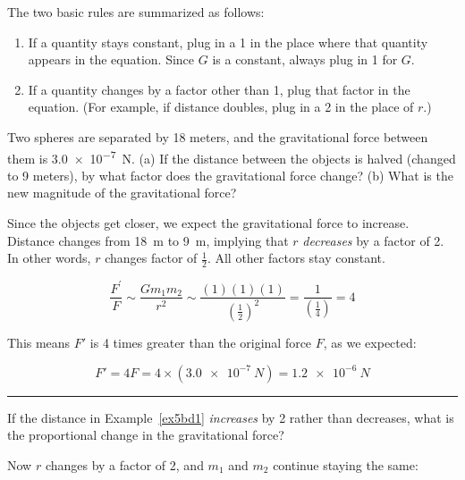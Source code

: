\documentclass{article}
\begin{document}
The two basic rules are summarized as follows:

\begin{enumerate}
\setlength\itemsep{0ex}
    \item If a quantity stays constant, plug in a 1 in the place where that quantity appears in the equation. Since $G$ is a constant, always plug in 1 for $G$.
    \item If a quantity changes by a factor other than 1, plug that factor in the equation. (For example, if distance doubles, plug in a 2 in the place of $r$.)
\end{enumerate}



\begin{example} \label{ex5bd1}
Two spheres are separated by 18 meters, and the gravitational force between them is \SI{3.0e-7}{N}. (a) If the distance between the objects is halved (changed to 9 meters), by what factor does the gravitational force change? (b) What is the new magnitude of the gravitational force?
\end{example}

\Solution Since the objects get closer, we expect the gravitational force to increase. Distance changes from \SI{18}{m} to \SI{9}{m}, implying that $r$ \textit{decreases} by a factor of 2. In other words, $r$ changes factor of $\frac{1}{2}$. All other factors stay constant. 

\begin{equation*}
    \frac{F^{\prime}}{F} \sim \frac{G m_1 m_2}{r^2} \sim \frac{(1)(1)(1)}{\left(\frac{1}{2}\right)^2} = \frac{1}{\left(\frac{1}{4}\right)} = 4
\end{equation*}

This means $F'$ is 4 times greater than the original force $F$, as we expected:

\begin{equation*}
    F' = 4 F = 4 \times  \left(\SI{3.0e-7}{N}\right) = \SI{1.2e-6}{N}
\end{equation*}


\vspace{1em}
\hrule

\begin{example}
If the distance in Example~\ref{ex5bd1} \textit{increases} by 2 rather than decreases, what is the proportional change in the gravitational force?
\end{example} 

\Solution Now $r$ changes by a factor of 2, and $m_1$ and $m_2$ continue staying the same:
\end{document}
